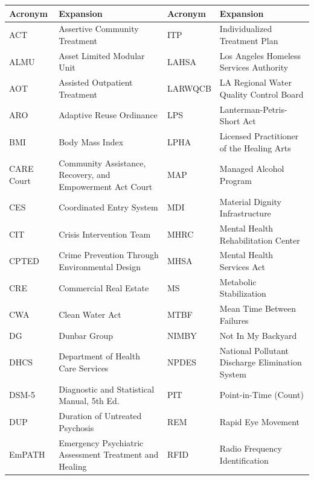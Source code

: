 {{\singlespacing\small
\begin{tabularx}{\textwidth}{@{}p{1.5cm}Xp{1.9cm}X@{}}
\toprule
\rowcolor{rowgray}
\textbf{Acronym} & \textbf{Expansion} & \textbf{Acronym} & \textbf{Expansion} \\
\midrule
ACT      & Assertive Community Treatment              & ITP     & Individualized Treatment Plan \\
\rowcolor{rowgray}
ALMU     & Asset Limited Modular Unit                 & LAHSA   & Los Angeles Homeless Services Authority \\
AOT      & Assisted Outpatient Treatment              & LARWQCB & LA Regional Water Quality Control Board \\
\rowcolor{rowgray}
ARO      & Adaptive Reuse Ordinance                   & LPS     & Lanterman-Petris-Short Act \\
BMI      & Body Mass Index                            & LPHA    & Licensed Practitioner of the Healing Arts \\
\rowcolor{rowgray}
CARE Court & Community Assistance, Recovery, and Empowerment Act Court & MAP & Managed Alcohol Program \\
CES      & Coordinated Entry System                   & MDI     & Material Dignity Infrastructure \\
\rowcolor{rowgray}
CIT      & Crisis Intervention Team                   & MHRC    & Mental Health Rehabilitation Center \\
CPTED    & Crime Prevention Through Environmental Design & MHSA & Mental Health Services Act \\
\rowcolor{rowgray}
CRE      & Commercial Real Estate                     & MS      & Metabolic Stabilization \\
CWA      & Clean Water Act                            & MTBF    & Mean Time Between Failures \\
\rowcolor{rowgray}
DG       & Dunbar Group                               & NIMBY   & Not In My Backyard \\
DHCS     & Department of Health Care Services         & NPDES   & National Pollutant Discharge Elimination System \\
\rowcolor{rowgray}
DSM-5    & Diagnostic and Statistical Manual, 5th Ed. & PIT    & Point-in-Time (Count) \\
DUP      & Duration of Untreated Psychosis            & REM     & Rapid Eye Movement \\
\rowcolor{rowgray}
EmPATH   & Emergency Psychiatric Assessment Treatment and Healing & RFID & Radio Frequency Identification \\

\end{tabularx}}}

